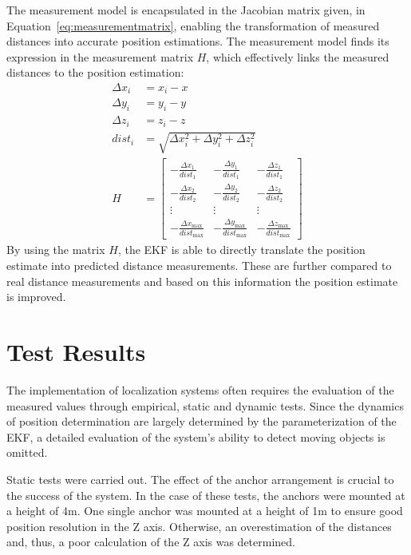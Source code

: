 \documentclass[conference, a4paper]{IEEEtran}
\begin{document}
The measurement model is encapsulated in the Jacobian matrix given, in Equation~\ref{eq:measurementmatrix},
enabling the transformation of measured distances into accurate position estimations.
The measurement model finds its expression in the measurement matrix $H$,
which effectively links the measured distances to the position estimation:
\begin{equation}
	\begin{aligned}
		\Delta x_i &= x_i - x \\
		\Delta y_i &= y_i - y \\
		\Delta z_i &= z_i - z \\
		dist_i &= \sqrt{{\Delta x_i^2 + \Delta y_i^2 + \Delta z_i^2}} \\
		H &= \begin{bmatrix}
			-\frac{{\Delta x_1}}{{dist_1}} & -\frac{{\Delta y_1}}{{dist_1}} & -\frac{{\Delta z_1}}{{dist_1}} \\
			-\frac{{\Delta x_2}}{{dist_2}} & -\frac{{\Delta y_2}}{{dist_2}} & -\frac{{\Delta z_2}}{{dist_2}} \\
			\vdots & \vdots & \vdots \\
			-\frac{{\Delta x_{\text{max}}}}{{dist_{\text{max}}}} & -\frac{{\Delta y_{\text{max}}}}{{dist_{\text{max}}}} & -\frac{{\Delta z_{\text{max}}}}{{dist_{\text{max}}}}
		\end{bmatrix}
	\end{aligned}
	\label{eq:measurementmatrix}
\end{equation}
By using the matrix $H$, the \ac{EKF} is able to directly translate the position estimate into predicted distance measurements.
These are further compared to real distance measurements and based on this information the position estimate is improved.


\section{Test Results}\label{section:tests}
The implementation of localization systems often requires the evaluation of the measured values through empirical,
static and dynamic tests.
Since the dynamics of position determination are largely determined by the parameterization of the \ac{EKF},
a detailed evaluation of the system's ability to detect moving objects is omitted.

Static tests were carried out.
The effect of the anchor arrangement is crucial to the success of the system.
In the case of these tests, the anchors were mounted at a height of 4m.
One single anchor was mounted at a height of 1m to ensure good position resolution in the Z axis.
Otherwise, an overestimation of the distances and, thus, a poor calculation of the Z axis was determined.
\end{document}
